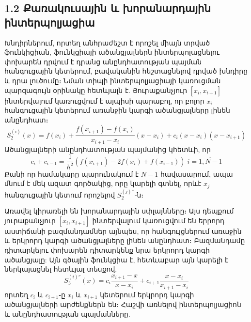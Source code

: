 \documentclass[fleqn, bachelor,subf,12pt,notitlepage]{article}
\begin{document}
\subsection*{1.2 Քառակուսային և խորանարդային ինտերպոլյացիա}
Խնդիրներում, որտեղ անհրաժեշտ է որոշել միայն տրված ֆունկիցիան, ֆունկցիայի ածանցյալներն ինտերպոլացնելու փոխարեն դրվում է դրանց անընդհատության պայման հանգուցային կետերում,  բավականին հեշտացնելով դրված խնդիրը և դրա լուծումը։
Նման տիպի ինտերպոլյացիայի կառուցման պարզագույն օրինակը հետևյալն է.
Յուրաքանչյուր $\left[x_{i}, x_{i+1}\right]$ ինտերվալում կառուցվում է այպիսի պարաբոլ, որ բոլոր $x_{i}$ հանգուցային կետերում առանջին կարգի ածանցյալները լինեն անընդհատ։
\begin{equation}
S_{2}^{(i)}(x)=f(x_{i})+\dfrac{f(x_{i+1})-f(x_{i})}{x_{i+1}-x_{i}}\left(x-x_{i}\right)+c_{i}\left(x-x_{i}\right)\left(x-x_{i+1}\right)
\end{equation}
Ածանցյալների անընդհատության պայմանից կհետևի, որ
\begin{equation}
c_{i}+c_{i-1}=\dfrac{1}{h^{2}}\left(f(x_{i+1})-2f(x_{i})+f(x_{i-1})\right) \; i=\overline{1, N-1}
\end{equation}
Քանի որ համակարը պարունակում է $N-1$ հավասարում, ապա մնում է մեկ ազատ գործակից, որը կարելի գտնել, որևէ $x_{j}$ հանգուցային կետում որոշելով $S_{2}^{(j)''}$֊ն։

Առավել կիրառելի են խորանարդային սփլայնները։ Այս դեպքում յուրաքանչյուր $\left[x_{i}, x_{i+1}\right]$ ինտերվալում կառուցվում են երրորդ աստիճանի բազմանդամներ այնպես, որ հանգույցներում առաջին և երկրորդ կարգի ածանցյալները լինեն անընդհատ։ 
Բազմանդամը դիտարկելու փոխարեն դիտարկենք նրա երկրորդ կարգի ածանցյալը: Այն գծային ֆունկցիա է, հետևաբար այն կարելի է ներկայացնել հետևյալ տեսքով.
\begin{equation}
S^{(i)''}_3(x)=c_{i}\dfrac{x_{i+1}-x}{x-x_{i}}+c_{i+1}\dfrac{x-x_{i}}{x_{i+1}-x_{i}}
\end{equation}
\noindent որտեղ $c_{i}$ և $c_{i+1}$֊ը $x_{i}$ և $x_{i+1}$ կետերում երկրորդ կարգի ածանցյալների արժենքներն են։ 
\noindent Հաշվի առնելով ինտերպոլյացիոն և անընդհատության պայմանները.
\end{document}
